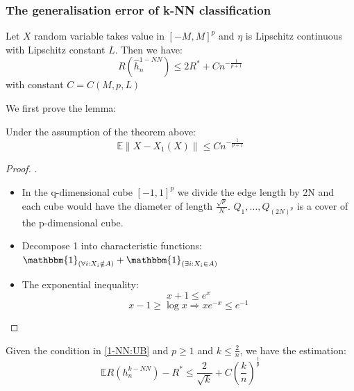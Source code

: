 \subsubsection*{The generalisation error of k-NN classification}

\begin{theorem} \label{1-NN:UB}
Let $X$ random variable takes value in $[-M, M]^p$ and $\eta$ is Lipschitz continuous with Lipschitz constant $L$. Then we have:
	\begin{equation*}
		R(\hat{h}_n^{1-NN}) \leq 2 R^* + C n^{-\frac{1}{p+1}}
	\end{equation*}
	with constant $C = C(M, p, L)$
\end{theorem}

We first prove the lemma:
\begin{lemma}
	Under the assumption of the theorem above:
	\begin{equation*}
		\mathbb{E} \| X - X_1(X) \| \leq C n^{-\frac{1}{p + 1}}
	\end{equation*}
\end{lemma}

\begin{proof}.
	\begin{itemize}
		\item In the q-dimensional cube $[-1, 1]^p$ we divide the edge length by 2N and each cube would have the diameter of length $\frac{\sqrt{p}}{N}$. $Q_1, \dots, Q_{(2N)^p}$ is a cover of the p-dimensional cube.
		\item Decompose 1 into characteristic functions: $\mathbbm{1}_{(\forall i: X_i \notin A)} + \mathbbm{1}_{(\exists i:X_i \in A)} $
		\item The exponential inequality:
			\begin{equation*}
				x + 1 \leq e^x
			\end{equation*}
			\begin{equation*}
				x - 1 \geq \log x \Rightarrow x e^{-x} \leq e^{-1}
			\end{equation*}
	\end{itemize}
\end{proof}

\begin{theorem}
	Given the condition in \ref{1-NN:UB} and $p \geq 1$ and $k \leq \frac{2}{n}$, we have the estimation:
	\begin{equation*}
		\mathbb{E} R(h^{k-NN}_n) - R^* \leq \frac{2}{\sqrt{k}} + C(\frac{k}{n})^{\frac{1}{p}}
	\end{equation*}
\end{theorem}


